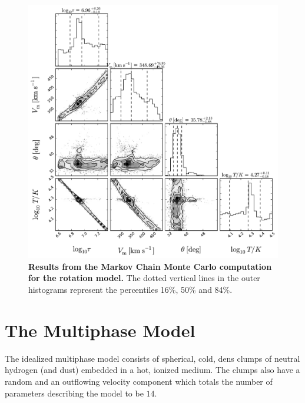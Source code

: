 \documentclass[a4paper, usenatbib, 12pt]{article}
\begin{document}
{\begin{figure}
\begin{center}
\includegraphics[width=1.0\textwidth]{emcee_results.pdf}
\caption{{\bf Results from the Markov Chain Monte Carlo computation for
    the rotation model.} The dotted vertical lines in the outer histograms 
	represent the percentiles 16\%, 50\% and 84\%. \label{emceeresults}} 
\end{center}
\end{figure}





\section*{The Multiphase Model} 

The idealized multiphase model consists of spherical, cold, dens
clumps of neutral hydrogen (and dust) embedded in a hot, ionized
medium. 
The clumps also have a random and an outflowing velocity
component which totals the number of parameters describing the model
to be $14$. 

}
\end{document}
